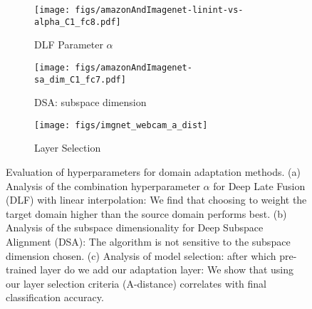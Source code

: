 \begin{figure}
\centering
\hspace{-4em}
\begin{subfigure}[b]{0.26\textwidth}
\centering
\texttt{[image: figs/amazonAndImagenet-linint-vs-alpha\_C1\_fc8.pdf]}
\caption{DLF Parameter $\alpha$}
\label{fig:linint-eval}
\end{subfigure}
%
\hspace{3em}
\begin{subfigure}[b]{0.27\textwidth}
\centering
\texttt{[image: figs/amazonAndImagenet-sa\_dim\_C1\_fc7.pdf]}
\caption{DSA: subspace dimension}
\label{fig:sagfk-eval}
\end{subfigure}
%
\begin{subfigure}[b]{0.28\textwidth}
\centering
\texttt{[image: figs/imgnet\_webcam\_a\_dist]}
\caption{Layer Selection}
\label{fig:a-dist-eval}
\end{subfigure}
%
\caption{Evaluation of hyperparameters for domain adaptation methods. (a) Analysis of the combination hyperparameter $\alpha$ for Deep Late Fusion (DLF) with linear interpolation: We find that choosing to weight the target domain higher than the source domain performs best.  (b) Analysis of the subspace dimensionality for Deep Subspace Alignment (DSA): The algorithm is not sensitive to the subspace dimension chosen. (c) Analysis of model selection: after which pre-trained layer do we add our adaptation layer: We show that using our layer selection criteria (A-distance) correlates with final classification accuracy.}
\label{fig:hyperparam-eval}
\end{figure}

